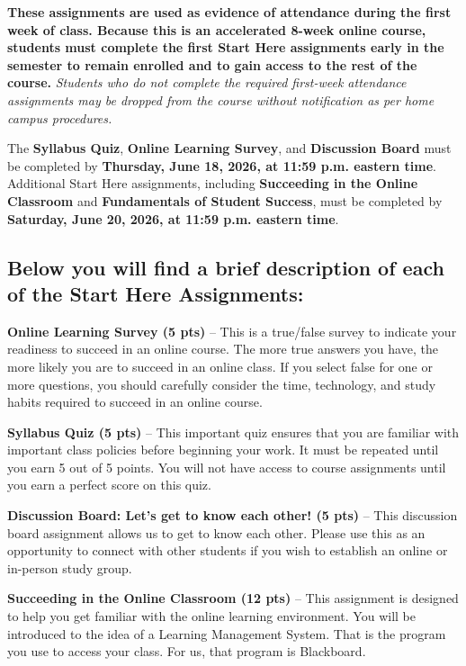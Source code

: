 \textbf{These assignments are used as evidence of attendance during the first week of class. Because this is an accelerated 8-week online course, students must complete the first Start Here assignments early in the semester to remain enrolled and to gain access to the rest of the course.} \textit{Students who do not complete the required first-week attendance assignments may be dropped from the course without notification as per home campus procedures.}

The \textbf{Syllabus Quiz}, \textbf{Online Learning Survey}, and \textbf{Discussion Board} must be completed by \textbf{Thursday, June 18, 2026, at 11:59 p.m. eastern time}. Additional Start Here assignments, including \textbf{Succeeding in the Online Classroom} and \textbf{Fundamentals of Student Success}, must be completed by \textbf{Saturday, June 20, 2026, at 11:59 p.m. eastern time}.



\subsection{Below you will find a brief description of each of the Start Here Assignments:}

\textbf{Online Learning Survey (5 pts)} -- This is a true/false survey to indicate your readiness to succeed in an online course. The more true answers you have, the more likely you are to succeed in an online class. If you select false for one or more questions, you should carefully consider the time, technology, and study habits required to succeed in an online course.

\textbf{Syllabus Quiz (5 pts)} -- This important quiz ensures that you are familiar with important class policies before beginning your work. It must be repeated until you earn 5 out of 5 points. You will not have access to course assignments until you earn a perfect score on this quiz.

\textbf{Discussion Board: Let's get to know each other! (5 pts)} -- This discussion board assignment allows us to get to know each other. Please use this as an opportunity to connect with other students if you wish to establish an online or in-person study group.

\textbf{Succeeding in the Online Classroom (12 pts)} -- This assignment is designed to help you get familiar with the online learning environment. You will be introduced to the idea of a Learning Management System. That is the program you use to access your class. For us, that program is Blackboard.

